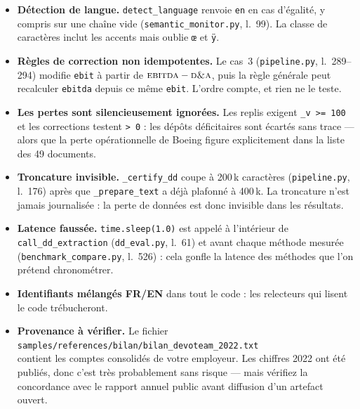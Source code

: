 \documentclass[11pt,a4paper]{article}
\newcommand{\fic}[1]{\texttt{\small #1}}
\begin{document}
\begin{itemize}[leftmargin=*, itemsep=4pt]
\item \textbf{Détection de langue.} \fic{detect\_language} renvoie \fic{en} en
cas d'égalité, y compris sur une chaîne vide (\fic{semantic\_monitor.py},
l.~99). La classe de caractères inclut les accents mais oublie \fic{\oe} et
\fic{ÿ}.

\item \textbf{Règles de correction non idempotentes.} Le cas~3
(\fic{pipeline.py}, l.~289--294) modifie \fic{ebit} à partir de
$\textsc{ebitda} - \textsc{d\&a}$, puis la règle générale peut recalculer
\fic{ebitda} depuis ce même \fic{ebit}. L'ordre compte, et rien ne le teste.

\item \textbf{Les pertes sont silencieusement ignorées.} Les replis exigent
\fic{\_v >= 100} et les corrections testent \fic{> 0} : les dépôts déficitaires
sont écartés sans trace --- alors que la perte opérationnelle de Boeing figure
explicitement dans la liste des 49 documents.

\item \textbf{Troncature invisible.} \fic{\_certify\_dd} coupe à 200\,k
caractères (\fic{pipeline.py}, l.~176) après que \fic{\_prepare\_text} a déjà
plafonné à 400\,k. La troncature n'est jamais journalisée : la perte de données
est donc invisible dans les résultats.

\item \textbf{Latence faussée.} \fic{time.sleep(1.0)} est appelé à l'intérieur
de \fic{call\_dd\_extraction} (\fic{dd\_eval.py}, l.~61) et avant chaque méthode
mesurée (\fic{benchmark\_compare.py}, l.~526) : cela gonfle la latence des
méthodes que l'on prétend chronométrer.

\item \textbf{Identifiants mélangés FR/EN} dans tout le code : les relecteurs
qui lisent le code trébucheront.

\item \textbf{Provenance à vérifier.} Le fichier\\
\fic{samples/references/bilan/bilan\_devoteam\_2022.txt}\\
contient les comptes
consolidés de votre employeur. Les chiffres 2022 ont été publiés, donc c'est
très probablement sans risque --- mais vérifiez la concordance avec le rapport
annuel public avant diffusion d'un artefact ouvert.
\end{itemize}

\end{document}
